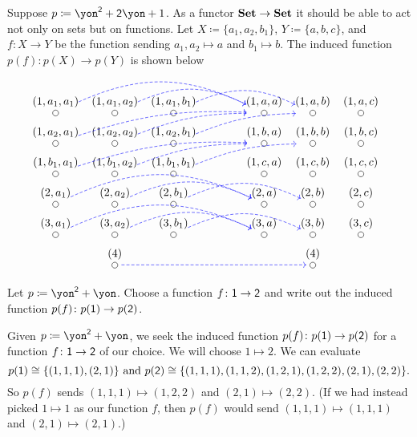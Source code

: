 \documentclass[Book-Poly]{subfiles}
\begin{document}
\begin{example}
Suppose $p\coloneqq\yon^\2+\2\yon+1$. As a functor $\textbf{Set}\to\textbf{Set}$ it should be able to act not only on sets but on functions. Let $X\coloneqq\{a_1,a_2,b_1\}$, $Y\coloneqq\{a,b,c\}$, and $f\colon X\to Y$ be the function sending $a_1,a_2\mapsto a$ and $b_1\mapsto b$. The induced function $p(f)\colon p(X)\to p(Y)$ is shown below
\[
\begin{tikzcd}[row sep=2pt, column sep=3pt, shorten <=-5pt, shorten >=-5pt, dashed]
\LMO{(1,a_1,a_1)}\ar[rrrr, blue, bend left=25pt]&\LMO{(1,a_1,a_2)}\ar[rrr, blue, bend left=25pt]&\LMO{(1,a_1,b_1)}\ar[rrr, blue, bend left=25pt]&[30pt]&
\LMO{(1,a,a)}&\LMO{(1,a,b)}&\LMO{(1,a,c)}&&
\\
\LMO{(1,a_2,a_1)}\ar[rrrru, blue, bend left=10pt]&\LMO{(1,a_2,a_2)}\ar[rrru, blue, bend left=10pt]&\LMO{(1,a_2,b_1)}\ar[rrru, blue, bend left=10pt]&&
\LMO{(1,b,a)}&\LMO{(1,b,b)}&\LMO{(1,b,c)}&&
\\
\LMO{(1,b_1,a_1)}\ar[rrrru, blue, bend left=10pt]&\LMO{(1,b_1,a_2)}\ar[rrru, blue, bend left=10pt]&\LMO{(1,b_1,b_1)}\ar[rrru, blue, bend left=10pt]&&
\LMO{(1,c,a)}&\LMO{(1,c,b)}&\LMO{(1,c,c)}&&
\\
\LMO{(2,a_1)}\ar[rrrr, blue, bend left=25pt]&\LMO{(2,a_2)}\ar[rrr, blue, bend left=25pt]&\LMO{(2,b_1)}\ar[rrr, blue, bend left=25pt]&&
\LMO{(2,a)}&\LMO{(2,b)}&\LMO{(2,c)}&&
\\
\LMO{(3,a_1)}\ar[rrrr, blue, bend left=25pt]&\LMO{(3,a_2)}\ar[rrr, blue, bend left=25pt]&\LMO{(3,b_1)}\ar[rrr, blue, bend left=25pt]&&
\LMO{(3,a)}&\LMO{(3,b)}&\LMO{(3,c)}&&
\\&
\LMO{(4)}\ar[rrrr, blue]&&&&\LMO{(4)}
\end{tikzcd}
\]
\end{example}

\begin{exercise}
Let $p\coloneqq\yon^\2+\yon$. Choose a function $f\colon\textsf{1}\to\textsf{2}$ and write out the induced function $p(f)\colon p(\textsf{1})\to p(\textsf{2})$.
\begin{solution}
Given $p\coloneqq\yon^\2+\yon$, we seek the induced function $p(f)\colon p(\textsf{1})\to p(\textsf{2})$ for a function $f\colon\textsf{1}\to\textsf{2}$ of our choice.
We will choose $1 \mapsto 2$.
We can evaluate
\[
    p(\textsf{1}) \cong \{(1, 1, 1), (2, 1)\} \text{ and } p(\textsf{2}) \cong \{(1, 1, 1), (1, 1, 2), (1, 2, 1), (1, 2, 2), (2, 1), (2, 2)\}.
\]
So $p(f)$ sends $(1, 1, 1) \mapsto (1, 2, 2)$ and $(2, 1) \mapsto (2, 2)$.
(If we had instead picked $1 \mapsto 1$ as our function $f$, then $p(f)$ would send $(1, 1, 1) \mapsto (1, 1, 1)$ and $(2, 1) \mapsto (2, 1)$.)
\end{solution}
\end{exercise}
\end{document}

